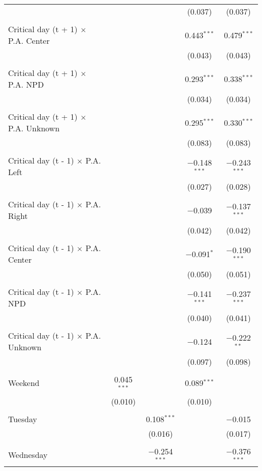 \documentclass[
]{article}
\begin{document}
\begin{table}[!htbp]
{\begin{tabular}{@{\extracolsep{5pt}}lcccc}
  &  &  & (0.037) & (0.037) \\ 
  & & & & \\ 
 Critical day (t + 1) $\times$ P.A. Center &  &  & 0.443$^{***}$ & 0.479$^{***}$ \\ 
  &  &  & (0.043) & (0.043) \\ 
  & & & & \\ 
 Critical day (t + 1) $\times$ P.A. NPD &  &  & 0.293$^{***}$ & 0.338$^{***}$ \\ 
  &  &  & (0.034) & (0.034) \\ 
  & & & & \\ 
 Critical day (t + 1) $\times$ P.A. Unknown &  &  & 0.295$^{***}$ & 0.330$^{***}$ \\ 
  &  &  & (0.083) & (0.083) \\ 
  & & & & \\ 
 Critical day (t - 1) $\times$ P.A. Left &  &  & $-$0.148$^{***}$ & $-$0.243$^{***}$ \\ 
  &  &  & (0.027) & (0.028) \\ 
  & & & & \\ 
 Critical day (t - 1) $\times$ P.A. Right &  &  & $-$0.039 & $-$0.137$^{***}$ \\ 
  &  &  & (0.042) & (0.042) \\ 
  & & & & \\ 
 Critical day (t - 1) $\times$ P.A. Center &  &  & $-$0.091$^{*}$ & $-$0.190$^{***}$ \\ 
  &  &  & (0.050) & (0.051) \\ 
  & & & & \\ 
 Critical day (t - 1) $\times$ P.A. NPD &  &  & $-$0.141$^{***}$ & $-$0.237$^{***}$ \\ 
  &  &  & (0.040) & (0.041) \\ 
  & & & & \\ 
 Critical day (t - 1) $\times$ P.A. Unknown &  &  & $-$0.124 & $-$0.222$^{**}$ \\ 
  &  &  & (0.097) & (0.098) \\ 
  & & & & \\ 
 Weekend & 0.045$^{***}$ &  & 0.089$^{***}$ &  \\ 
  & (0.010) &  & (0.010) &  \\ 
  & & & & \\ 
 Tuesday &  & 0.108$^{***}$ &  & $-$0.015 \\ 
  &  & (0.016) &  & (0.017) \\ 
  & & & & \\ 
 Wednesday &  & $-$0.254$^{***}$ &  & $-$0.376$^{***}$ \\ 

\end{tabular}}
\end{table}
\end{document}

